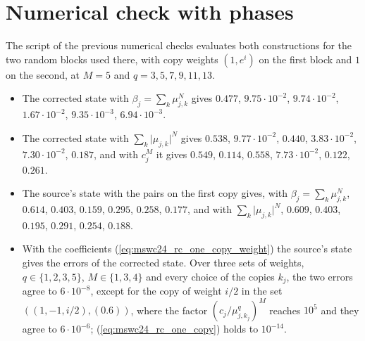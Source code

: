 \documentclass{article}
\begin{document}
\section{Numerical check with phases}
The script of the previous numerical checks evaluates both constructions for the two random
blocks used there, with copy weights $(1,e^{i})$ on the first block and $1$ on the second, at
$M=5$ and $q=3,5,7,9,11,13$.
\begin{itemize}
    \item The corrected state with $\beta_j=\sum_k\mu_{j,k}^N$ gives $0.477$, $9.75\cdot10^{-2}$,
          $9.74\cdot10^{-2}$, $1.67\cdot10^{-2}$, $9.35\cdot10^{-3}$, $6.94\cdot10^{-3}$.
    \item The corrected state with $\sum_k\lvert\mu_{j,k}\rvert^N$ gives $0.538$,
          $9.77\cdot10^{-2}$, $0.440$, $3.83\cdot10^{-2}$, $7.30\cdot10^{-2}$, $0.187$, and with
          $c_j^M$ it gives $0.549$, $0.114$, $0.558$, $7.73\cdot10^{-2}$, $0.122$, $0.261$.
    \item The source's state with the pairs on the first copy gives, with
          $\beta_j=\sum_k\mu_{j,k}^N$, $0.614$, $0.403$, $0.159$, $0.295$, $0.258$, $0.177$,
          and with $\sum_k\lvert\mu_{j,k}\rvert^N$, $0.609$, $0.403$, $0.195$, $0.291$,
          $0.254$, $0.188$.
    \item With the coefficients (\ref{eq:mswc24_rc_one_copy_weight}) the source's state gives
          the errors of the corrected state. Over three sets of weights, $q\in\{1,2,3,5\}$,
          $M\in\{1,3,4\}$ and every choice of the copies $k_j$, the two errors agree to
          $6\cdot10^{-8}$, except for the copy of weight $i/2$ in the set
          $((1,-1,i/2),(0.6))$, where the factor $(c_j/\mu_{j,k_j}^q)^M$ reaches $10^5$ and
          they agree to $6\cdot10^{-6}$; (\ref{eq:mswc24_rc_one_copy}) holds to $10^{-14}$.
\end{itemize}
\end{document}
